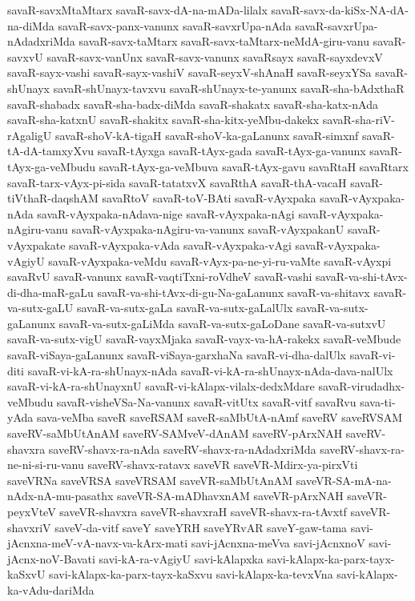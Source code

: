 {savaR-savxMtaMtarx
savaR-savx-dA-na-mADa-lilalx
savaR-savx-da-kiSx-NA-dA-na-diMda
savaR-savx-panx-vanunx
savaR-savxrUpa-nAda
savaR-savxrUpa-nAdadxriMda
savaR-savx-taMtarx
savaR-savx-taMtarx-neMdA-giru-vanu
savaR-savxvU
savaR-savx-vanUnx
savaR-savx-vanunx
savaRsayx
savaR-sayxdevxV
savaR-sayx-vashi
savaR-sayx-vashiV
savaR-seyxV-shAnaH
savaR-seyxYSa
savaR-shUnayx
savaR-shUnayx-tavxvu
savaR-shUnayx-te-yanunx
savaR-sha-bAdxthaR
savaR-shabadx
savaR-sha-badx-diMda
savaR-shakatx
savaR-sha-katx-nAda
savaR-sha-katxnU
savaR-shakitx
savaR-sha-kitx-yeMbu-dakekx
savaR-sha-riV-rAgaligU
savaR-shoV-kA-tigaH
savaR-shoV-ka-gaLanunx
savaR-simxnf
savaR-tA-dA-tamxyXvu
savaR-tAyxga
savaR-tAyx-gada
savaR-tAyx-ga-vanunx
savaR-tAyx-ga-veMbudu
savaR-tAyx-ga-veMbuva
savaR-tAyx-gavu
savaRtaH
savaRtarx
savaR-tarx-vAyx-pi-sida
savaR-tatatxvX
savaRthA
savaR-thA-vacaH
savaR-tiVthaR-daqshAM
savaRtoV
savaR-toV-BAti
savaR-vAyxpaka
savaR-vAyxpaka-nAda
savaR-vAyxpaka-nAdava-nige
savaR-vAyxpaka-nAgi
savaR-vAyxpaka-nAgiru-vanu
savaR-vAyxpaka-nAgiru-va-vanunx
savaR-vAyxpakanU
savaR-vAyxpakate
savaR-vAyxpaka-vAda
savaR-vAyxpaka-vAgi
savaR-vAyxpaka-vAgiyU
savaR-vAyxpaka-veMdu
savaR-vAyx-pa-ne-yi-ru-vaMte
savaR-vAyxpi
savaRvU
savaR-vanunx
savaR-vaqtiTxni-roVdheV
savaR-vashi
savaR-va-shi-tAvx-di-dha-maR-gaLu
savaR-va-shi-tAvx-di-gu-Na-gaLanunx
savaR-va-shitavx
savaR-va-sutx-gaLU
savaR-va-sutx-gaLa
savaR-va-sutx-gaLalUlx
savaR-va-sutx-gaLanunx
savaR-va-sutx-gaLiMda
savaR-va-sutx-gaLoDane
savaR-va-sutxvU
savaR-va-sutx-vigU
savaR-vayxMjaka
savaR-vayx-va-hA-rakekx
savaR-veMbude
savaR-viSaya-gaLanunx
savaR-viSaya-garxhaNa
savaR-vi-dha-dalUlx
savaR-vi-diti
savaR-vi-kA-ra-shUnayx-nAda
savaR-vi-kA-ra-shUnayx-nAda-dava-nalUlx
savaR-vi-kA-ra-shUnayxnU
savaR-vi-kAlapx-vilalx-dedxMdare
savaR-virudadhx-veMbudu
savaR-visheVSa-Na-vanunx
savaR-vitUtx
savaR-vitf
savaRvu
sava-ti-yAda
sava-veMba
saveR
saveRSAM
saveR-saMbUtA-nAmf
saveRV
saveRVSAM
saveRV-saMbUtAnAM
saveRV-SAMveV-dAnAM
saveRV-pArxNAH
saveRV-shavxra
saveRV-shavx-ra-nAda
saveRV-shavx-ra-nAdadxriMda
saveRV-shavx-ra-ne-ni-si-ru-vanu
saveRV-shavx-ratavx
saveVR
saveVR-Mdirx-ya-pirxVti
saveVRNa
saveVRSA
saveVRSAM
saveVR-saMbUtAnAM
saveVR-SA-mA-na-nAdx-nA-mu-pasathx
saveVR-SA-mADhavxnAM
saveVR-pArxNAH
saveVR-peyxVteV
saveVR-shavxra
saveVR-shavxraH
saveVR-shavx-ra-tAvxtf
saveVR-shavxriV
saveV-da-vitf
saveY
saveYRH
saveYRvAR
saveY-gaw-tama
savi-jAcnxna-meV-vA-navx-va-kArx-mati
savi-jAcnxna-meVva
savi-jAcnxnoV
savi-jAcnx-noV-Bavati
savi-kA-ra-vAgiyU
savi-kAlapxka
savi-kAlapx-ka-parx-tayx-kaSxvU
savi-kAlapx-ka-parx-tayx-kaSxvu
savi-kAlapx-ka-tevxVna
savi-kAlapx-ka-vAdu-dariMda
}
